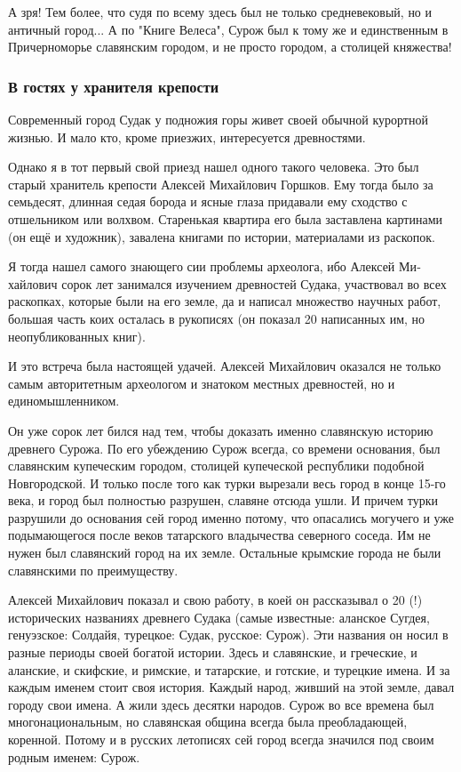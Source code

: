 А зря! Тем более, что судя по всему здесь был не только средневековый, но и
античный город... А по "Книге Велеса", Сурож был к тому же и единственным в
Причерноморье славянским городом, и не просто городом, а столицей княжества!

\subsubsection{В гостях у хранителя крепости}

Современный город Судак у подножия горы живет своей обычной курортной жизнью. И
мало кто, кроме приезжих, интере­суется древностями.

Однако я в тот первый свой приезд нашел одного такого человека. Это был старый
хранитель крепости Алексей Михайлович Горшков. Ему тогда было за семьдесят,
длинная седая борода и ясные глаза придавали ему сходство с отшельником или
волхвом. Старенькая квартира его была заставлена картинами (он ещё и художник),
завалена книгами по истории, материалами из раскопок.

Я тогда нашел самого знающего сии проблемы археолога, ибо Алексей Ми­хайлович
сорок лет занимался изучением древностей Судака, участвовал во всех раскопках,
которые были на его земле, да и написал множество на­учных работ, боль­шая
часть коих осталась в рукописях (он показал 20 написанных им, но
неопубликованных книг).

И это встреча была настоящей удачей. Алексей Михайлович оказался не только
самым авторитетным археологом и знатоком местных древностей, но и
единомышленником.

Он уже сорок лет бился над тем, чтобы доказать именно славянскую историю
древнего Сурожа. По его убеждению Сурож всегда, со времени основания, был
славянским купеческим городом, столицей купеческой республики подобной
Новгородской. И только после того как турки вырезали весь город в конце 15-го
века, и город был полностью разрушен, славяне отсюда ушли. И причем турки
разрушили до основания сей город именно потому, что опасались могучего и уже
подымающегося после веков татарского владычества северного соседа. Им не нужен
был славянский город на их земле. Остальные крымские города не были славянскими
по пре­имуществу.

Алексей Михайлович показал и свою работу, в коей он рассказывал о 20 (!)
исторических названиях древнего Судака (самые известные: аланское Сугдея,
генуэзское: Солдайя, турецкое: Судак, русское: Сурож). Эти названия он носил в
разные периоды своей богатой истории. Здесь и славянские, и греческие, и
аланские, и скифские, и римские, и татарские, и готские, и турецкие имена. И за
каждым именем стоит своя история. Каждый народ, живший на этой земле, давал
городу свои имена. А жили здесь десятки народов. Сурож во все времена был
многонациональным, но славянская община всегда была преобладающей, коренной.
Потому и в русских летописях сей город всегда значился под своим родным именем:
Сурож.

